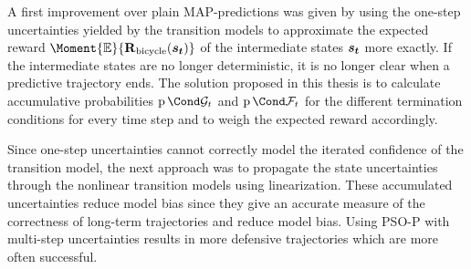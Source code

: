 A first improvement over plain MAP-predictions was given by using the one-step uncertainties yielded by the transition models to approximate the expected reward $\Moment{\E}{\RwdBicycle(\rv{s_t})}$ of the intermediate states $\bm{s_t}$ more exactly.
If the intermediate states are no longer deterministic, it is no longer clear when a predictive trajectory ends.
The solution proposed in this thesis is to calculate accumulative probabilities $\Prob{\PGoal_t}$ and $\Prob{\PFallen_t}$ for the different termination conditions for every time step and to weigh the expected reward accordingly.

Since one-step uncertainties cannot correctly model the iterated confidence of the transition model, the next approach was to propagate the state uncertainties through the nonlinear transition models using linearization.
These accumulated uncertainties reduce model bias since they give an accurate measure of the correctness of long-term trajectories and reduce model bias.
Using PSO-P with multi-step uncertainties results in more defensive trajectories which are more often successful.
